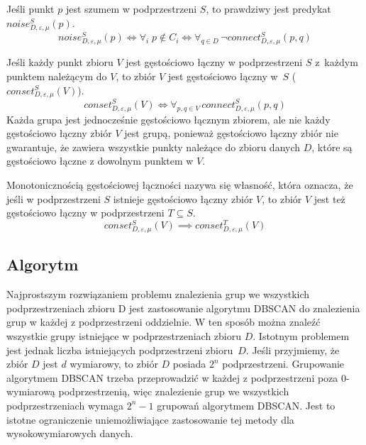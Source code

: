  \newline
Jeśli punkt $ p $ jest szumem w podprzestrzeni $ S $, to prawdziwy jest predykat $ noise^S_{D,\varepsilon,\mu}(p) $.
\begin{equation}
	noise^S_{D,\varepsilon,\mu}(p) \iff \forall_i \;p\notin C_i \iff \forall_{q \in D} \,\neg connect^S_{D,\varepsilon,\mu}(p,q)
\end{equation}

\newline
Jeśli każdy punkt zbioru $ V $ jest gęstościowo łączny w podprzestrzeni $ S $ \pagebreak \linebreak\mbox{z każdym} punktem należącym do $ V $, to zbiór $ V $ jest gęstościowo łączny \mbox{w $ S $} ($ conset^S_{D,\varepsilon, \mu}(V) $).
\begin{equation}
	conset^S_{D,\varepsilon, \mu}(V) \iff \forall_{p,q\in V}\,connect^S_{D,\varepsilon, \mu}(p,q)
\end{equation}
Każda grupa jest jednocześnie gęstościowo łącznym zbiorem, ale nie każdy gęstościowo łączny zbiór $ V $ jest grupą, ponieważ gęstościowo łączny zbiór nie gwarantuje, że zawiera wszystkie punkty należące do zbioru danych $ D $, które są gęstościowo łączne z dowolnym punktem w $ V $.
\smallskip

\newline
Monotonicznością gęstościowej łączności nazywa się własność, która oznacza, że jeśli w podprzestrzeni $ S $ istnieje gęstościowo łączny zbiór $ V $, to zbiór $ V $ jest też gęstościowo łączny w podprzestrzeni $ T \subseteq S $.
\begin{equation}
	conset^S_{D,\varepsilon,\mu}(V) \implies conset^T_{D,\varepsilon,\mu}(V)
\end{equation}

\subsection{Algorytm}
Najprostszym rozwiązaniem problemu znalezienia grup we wszystkich podprzestrzeniach zbioru D jest zastosowanie algorytmu DBSCAN do znalezienia grup w każdej z podprzestrzeni oddzielnie. W ten sposób można znaleźć wszystkie grupy istniejące w podprzestrzeniach zbioru $ D $. Istotnym problemem jest jednak liczba istniejących podprzestrzeni \mbox{zbioru $ D $}. Jeśli przyjmiemy, że zbiór $ D $ jest $ d $ wymiarowy, to zbiór $ D $ posiada $ 2^n $ podprzestrzeni. Grupowanie algorytmem DBSCAN trzeba przeprowadzić w każdej z podprzestrzeni poza $ 0 $-wymiarową podprzestrzenią, więc znalezienie grup we wszystkich podprzestrzeniach wymaga $ 2^n-1 $ grupowań algorytmem DBSCAN. Jest to istotne ograniczenie uniemożliwiające zastosowanie tej metody dla wysokowymiarowych danych.


